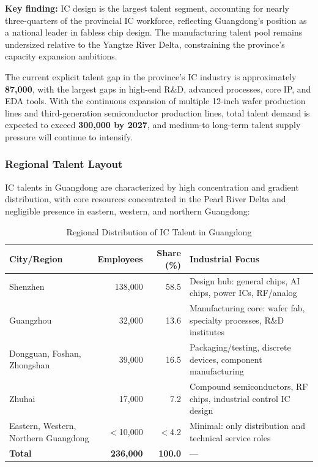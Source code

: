 \documentclass[12pt,a4paper]{article}
\newcommand{\tableHeaderRow}{\rowcolor{tealPrimary}\color{white}}
\newcommand{\tableOddRow}{\rowcolor{mintBG}}
\newcommand{\tableEvenRow}{\rowcolor{white}}
\begin{document}
\textbf{Key finding:} IC design is the largest talent segment, accounting for
nearly three-quarters of the provincial IC workforce, reflecting Guangdong's
position as a national leader in fabless chip design. The manufacturing talent
pool remains undersized relative to the Yangtze River Delta, constraining the
province's capacity expansion ambitions.

The current explicit talent gap in the province's IC industry is approximately
\textbf{87,000}, with the largest gaps in high-end R\&D, advanced processes,
core IP, and EDA tools. With the continuous expansion of multiple 12-inch wafer
production lines and third-generation semiconductor production lines, total
talent demand is expected to exceed \textbf{300,000 by 2027}, and medium-to
long-term talent supply pressure will continue to intensify.

\subsubsection{Regional Talent Layout}

IC talents in Guangdong are characterized by high concentration and gradient
distribution, with core resources concentrated in the Pearl River Delta and
negligible presence in eastern, western, and northern Guangdong:

\begin{table}[H]
\centering
\caption{Regional Distribution of IC Talent in Guangdong}
\label{tab:talent_region}
\begin{tabular}{p{3.5cm}rrp{6.8cm}}
\toprule
\tableHeaderRow
\textbf{City/Region} & \textbf{Employees} & \textbf{Share (\%)} & \textbf{Industrial Focus} \\
\midrule
\tableOddRow  Shenzhen & 138,000 & 58.5 & Design hub: general chips, AI chips, power ICs, RF/analog \\
\tableEvenRow Guangzhou & 32,000 & 13.6 & Manufacturing core: wafer fab, specialty processes, R\&D institutes \\
\tableOddRow  Dongguan, Foshan, Zhongshan & 39,000 & 16.5 & Packaging/testing, discrete devices, component manufacturing \\
\tableEvenRow Zhuhai & 17,000 & 7.2 & Compound semiconductors, RF chips, industrial control IC design \\
\tableOddRow  Eastern, Western, Northern Guangdong & $<$10,000 & $<$4.2 & Minimal: only distribution and technical service roles \\
\midrule
\tableEvenRow \textbf{Total} & \textbf{236,000} & \textbf{100.0} & --- \\
\bottomrule
\end{tabular}
\end{table}
\end{document}
